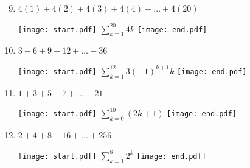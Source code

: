 \documentclass[12pt]{article}
\begin{document}
\begin{enumerate}
\setcounter{enumi}{8}

\item $4(1)+4(2)+4(3)+4(4)+\dots +4(20)$ 

\texttt{[image: start.pdf]}
{{$\sum_{k=1}^{20}4k$}}
\texttt{[image: end.pdf]}


\item $3-6+9-12+ \dots -36$ 

\texttt{[image: start.pdf]}
{{$\sum_{k=1}^{12}3(-1)^{k+1}k$}}
\texttt{[image: end.pdf]}


\item $1+3+5+7+ \dots + 21$

\texttt{[image: start.pdf]}
{{$\sum_{k=0}^{10}(2k+1)$}}
\texttt{[image: end.pdf]}


\item $2+4+8+16+ \dots + 256$

\texttt{[image: start.pdf]}
{{$\sum_{k=1}^{8}2^k$}}
\texttt{[image: end.pdf]}


\end{enumerate}

\end{document}
